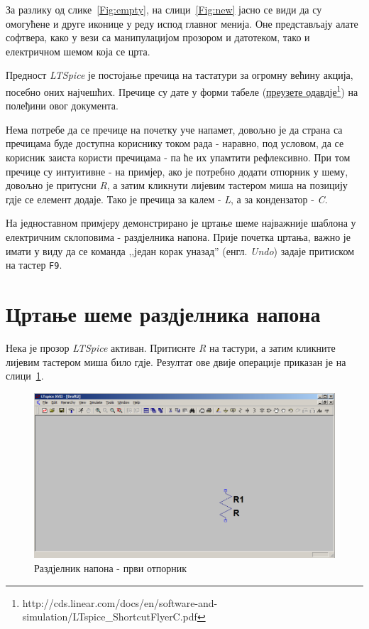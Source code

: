 За разлику од слике~\ref{Fig:empty}, на слици~\ref{Fig:new} јасно се види да су омогућене и друге иконице у реду испод главног менија. Оне представљају алате софтвера, како у вези са манипулацијом прозором и датотеком, тако и електричном шемом која се црта.

Предност \textit{LTSpice} је постојање пречица на тастатури за огромну већину акција, посебно оних најчешћих. Пречице су дате у форми табеле (\href{http://cds.linear.com/docs/en/software-and-simulation/LTspice_ShortcutFlyerC.pdf}{преузете одавдје\footnote{\url{http://cds.linear.com/docs/en/software-and-simulation/LTspice_ShortcutFlyerC.pdf}}}) на полеђини овог документа.

Нема потребе да се пречице на почетку уче напамет, довољно је да страна са пречицама буде доступна кориснику током рада - наравно, под условом, да се корисник заиста користи пречицама - па ће их упамтити рефлексивно. При том пречице су интуитивне - на примјер, ако је потребно додати отпорник у шему, довољно је притусни \textit{R}, а затим кликнути лијевим тастером миша на позицију гдје се елемент додаје. Тако је пречица за калем - \textit{L}, а за кондензатор - \textit{C}.

На једноставном примјеру демонстрирано је цртање шеме најважније шаблона у електричним склоповима - раздјелника напона. Прије почетка цртања, важно је имати у виду да се команда ,,један корак уназад'' (енгл. \textit{Undo}) задаје притиском на тастер \texttt{F9}.

\section{Цртање шеме раздјелника напона}
\label{rn}

Нека је прозор \textit{LTSpice} активан. Притиснте \textit{R} на тастури, а затим кликните лијевим тастером миша било гдје. Резултат ове двије операције приказан је на слици~\ref{Fig:rn-r1}.

\begin{figure}[h]
\centering
\includegraphics[width=\figwidth\textwidth]{figs/rn-r1.PNG}
\caption{Раздјелник напона - први отпорник}
\label{Fig:rn-r1}
\end{figure}

